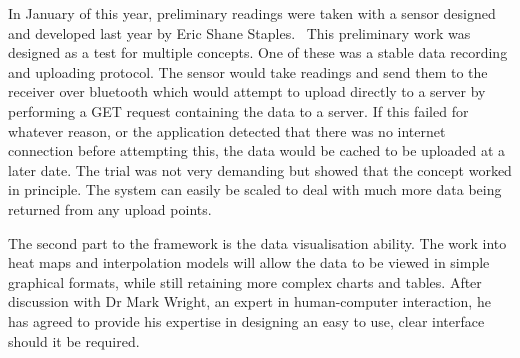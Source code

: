 In January of this year, preliminary readings were taken with a sensor designed and developed last year by Eric Shane Staples.~\cite{envisensor} This preliminary work was designed as a test for multiple concepts. One of these was a stable data recording and uploading protocol. The sensor would take readings and send them to the receiver over bluetooth which would attempt to upload directly to a server by performing a GET request containing the data to a server. If this failed for whatever reason, or the application detected that there was no internet connection before attempting this, the data would be cached to be uploaded at a later date. The trial was not very demanding but showed that the concept worked in principle. The system can easily be scaled to deal with much more data being returned from any upload points. 

The second part to the framework is the data visualisation ability. The work into heat maps and interpolation models will allow the data to be viewed in simple graphical formats, while still retaining more complex charts and tables. After discussion with Dr Mark Wright, an expert in human-computer interaction, he has agreed to provide his expertise in designing an easy to use, clear interface should it be required. 
